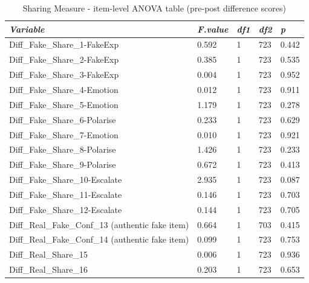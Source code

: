 \documentclass[empirical, authordate, issue]{jote-new-article}
\begin{document}
\begin{table}

  \caption{Sharing Measure - item-level ANOVA table (pre-post difference scores)}
  \label{tab:tableS28}


  \begin{tabularx}{\linewidth}{@{} X  l  l  l  l@{}}

    \toprule
    \emph{Variable}                                  & \emph{F.value} & \emph{df1} & \emph{df2} & \emph{p} \\
    \midrule
    Diff\_Fake\_Share\_1-FakeExp                     & 0.592          & 1          & 723        & 0.442    \\
    Diff\_Fake\_Share\_2-FakeExp                     & 0.385          & 1          & 723        & 0.535    \\
    Diff\_Fake\_Share\_3-FakeExp                     & 0.004          & 1          & 723        & 0.952    \\
    Diff\_Fake\_Share\_4-Emotion                     & 0.012          & 1          & 723        & 0.911    \\
    Diff\_Fake\_Share\_5-Emotion                     & 1.179          & 1          & 723        & 0.278    \\
    Diff\_Fake\_Share\_6-Polarise                    & 0.233          & 1          & 723        & 0.629    \\
    Diff\_Fake\_Share\_7-Emotion                     & 0.010          & 1          & 723        & 0.921    \\
    Diff\_Fake\_Share\_8-Polarise                    & 1.426          & 1          & 723        & 0.233    \\
    Diff\_Fake\_Share\_9-Polarise                    & 0.672          & 1          & 723        & 0.413    \\
    Diff\_Fake\_Share\_10-Escalate                   & 2.935          & 1          & 723        & 0.087    \\
    Diff\_Fake\_Share\_11-Escalate                   & 0.146          & 1          & 723        & 0.703    \\
    Diff\_Fake\_Share\_12-Escalate                   & 0.144          & 1          & 723        & 0.705    \\
    Diff\_Real\_Fake\_Conf\_13 (authentic fake item) & 0.664          & 1          & 703        & 0.415    \\
    Diff\_Real\_Fake\_Conf\_14 (authentic fake item) & 0.099          & 1          & 723        & 0.753    \\
    Diff\_Real\_Share\_15                            & 0.006          & 1          & 723        & 0.936    \\
    Diff\_Real\_Share\_16                            & 0.203          & 1          & 723        & 0.653    \\
    \bottomrule
  \end{tabularx}


\end{table}
\end{document}
